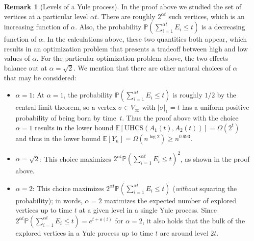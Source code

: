 \documentclass[11pt]{article}
\numberwithin{equation}{section}
\newcommand{\E}{\mathbb{E}} %
\newcommand{\UHCS}{\mathrm{UHCS}} %
\newcommand{\prob}[1]{\mathbb{P} \left( #1 \right)}
\theoremstyle{definition}
\newtheorem{remark}[theorem]{Remark}
\begin{document}
\begin{remark}[Levels of a Yule process]\label{remark:levels} 
In the proof above we studied the set of vertices at a particular level $\alpha t$. 
There are roughly $2^{\alpha t}$ such vertices, which is an increasing function of $\alpha$. 
Also, the probability 
$\prob{\sum_{i=1}^{\alpha t}E_i\leq t}$ 
is a decreasing function of $\alpha$. 
In the calculations above, these two quantities both appear, 
which results in an optimization problem that presents a tradeoff between high and low values of $\alpha$. 
For the particular optimization problem above, the two effects balance out at $\alpha = \sqrt{2}$. 
We mention that there are other natural choices of $\alpha$ that may be considered: 
\begin{itemize}
\item $\alpha = 1$: 
At $\alpha = 1$, the probability 
$\prob{\sum_{i=1}^{\alpha t}E_i\leq t}$ 
is roughly $1/2$ by the central limit theorem, so a vertex $\sigma \in V_\infty$ with $|\sigma|_{1}=t$ has a uniform positive probability of being born by time~$t$. 
Thus the proof above with the choice $\alpha = 1$ 
results in the lower bound 
$\E \left[ \UHCS(A_{1}(t), A_{2}(t)) \right] 
= \Omega(2^{t})$ 
and thus 
in the lower bound 
$\E[Y_{n}] = \Omega(n^{\log 2}) \geq n^{0.693}$.


\item $\alpha = \sqrt{2}$: This choice maximizes 
$2^{\alpha t} \prob{\sum_{i=1}^{\alpha t}E_i\leq t}^{2}$, 
as shown in the proof above.

\item $\alpha = 2$: This choice maximizes 
$2^{\alpha t} \prob{\sum_{i=1}^{\alpha t}E_i\leq t}$ 
(\emph{without} squaring the probability); in words, $\alpha = 2$ maximizes the expected number of explored vertices up to time $t$ at a given level in a single Yule process. 
Since $2^{\alpha t} \prob{\sum_{i=1}^{\alpha t}E_i\leq t}=e^{t+o(t)}$ for $\alpha = 2$, 
it also holds that the bulk of the explored vertices 
in a Yule process 
up to time $t$ are around level $2t$. 

\end{itemize}
\end{remark}
\end{document}
